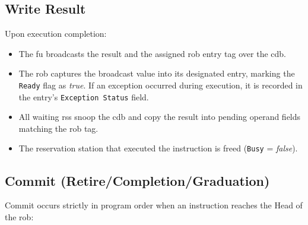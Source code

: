 \subsection{Write Result}
Upon execution completion:
\begin{itemize}
    \item The \gls{fu} broadcasts the result and the assigned \gls{rob} entry tag over the \gls{cdb}.
    \item The \gls{rob} captures the broadcast value into its designated entry, marking the \texttt{Ready} flag as \textit{true}. If an exception occurred during execution, it is recorded in the entry's \texttt{Exception Status} field.
    \item All waiting \glspl{rs} snoop the \gls{cdb} and copy the result into pending operand fields matching the \gls{rob} tag.
    \item The reservation station that executed the instruction is freed (\texttt{Busy} = \textit{false}).
\end{itemize}

\subsection{Commit (Retire/Completion/Graduation)}
Commit occurs strictly in program order when an instruction reaches the Head of the \gls{rob}:

